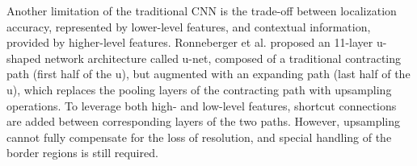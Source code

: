 Another limitation of the traditional CNN is the trade-off between localization
accuracy, represented by lower-level features, and contextual information,
provided by higher-level features.
%
Ronneberger et al. \cite{ronneberger2015}
%
%
proposed an 11-layer u-shaped network architecture called u-net,
composed of a traditional contracting path (first half of the u), but augmented
with an expanding path (last half of the u), which replaces the pooling layers
of the contracting path with upsampling operations. To leverage both high- and
low-level features, shortcut connections are added between corresponding layers
of the two paths.
However,
upsampling cannot fully compensate for the loss of resolution, and special
handling of the border regions is still required.

% 


